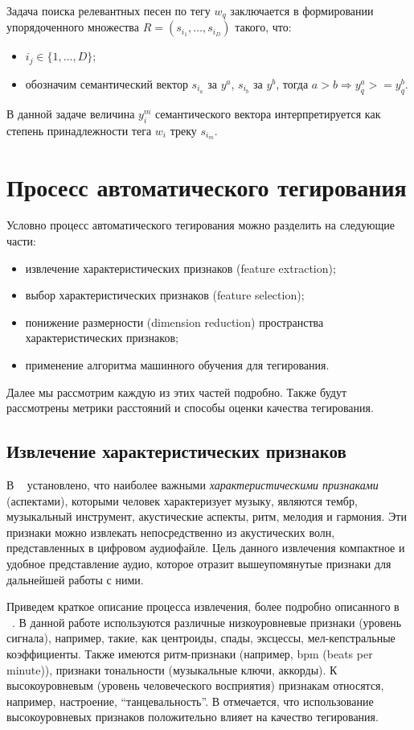Задача поиска релевантных песен по тегу $w_q$ заключается в формировании упорядоченного множества $R = (s_{i_1}, \ldots, s_{i_D})$ такого, что:
\begin{itemize}
 \item $i_j \in \{1, \ldots, D \}$;
 \item обозначим семантический вектор $s_{i_a}$ за $y^a$, $s_{i_b}$ \ld за $y^b$, тогда $a > b \Rightarrow y^a_q >= y^b_q $.
\end{itemize}
В данной задаче величина $y^m_i$ семантического вектора интерпретируется как степень принадлежности тега $w_i$ треку $s_{i_m}$. 
 
\section{Просесс автоматического тегирования}

Условно процесс автоматического тегирования можно разделить на следующие части:
\begin{itemize}
 \item извлечение характеристических признаков (feature extraction);
 \item выбор характеристических признаков (feature selection);
 \item понижение размерности (dimension reduction) пространства характеристических признаков;
 \item применение алгоритма машинного обучения для тегирования.
\end{itemize}

Далее мы рассмотрим каждую из этих частей подробно. Также будут рассмотрены метрики расстояний и способы оценки качества тегирования.

\subsection{Извлечение характеристических признаков}

В ~\cite{orio} установлено, что наиболее важными \emph{характеристическими признаками} (аспектами), 
которыми человек характеризует музыку, являются тембр, музыкальный инструмент, акустические аспекты, ритм, мелодия и гармония.
Эти признаки можно извлекать непосредственно из акустических волн, представленных в цифровом аудиофайле. Цель данного извлечения \ld компактное и удобное
представление аудио, которое отразит вышеупомянутые признаки для дальнейшей работы с ними.

Приведем краткое описание процесса извлечения, более подробно описанного в ~\cite{msordo_thesis, tzanetakis, salamon1, salamon2}.
В данной работе используются различные низкоуровневые признаки (уровень сигнала), например, такие, как центроиды, спады, эксцессы, мел-кепстральные коэффициенты.
Также имеются ритм-признаки (например, bpm (beats per minute)), признаки тональности (музыкальные ключи, аккорды). К высокоуровневым (уровень человеческого восприятия) признакам 
относятся, например, настроение, ``танцевальность''. В \cite{msordo_thesis, highlevel_genre} отмечается, что использование высокоуровневых признаков
положительно влияет на качество тегирования.

